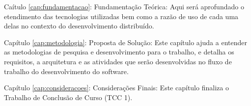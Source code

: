 Caítulo \ref{cap:fundamentacao}: Fundamentação Teórica: Aqui será aprofundado o etendimento das tecnologias utilizadas bem como a razão de uso de cada uma delas no contexto do desenvolvimento distribuído.

Capítulo \ref{cap:metodologia}: Proposta de Solução: Este capítulo ajuda a entender as metodologias de pesquisa e desenvolvimento para o trabalho, e detalha os requisitos, a arquitetura e as atividades que serão desenvolvidas no fluxo de trabalho do desenvolvimento do software.

Capítulo \ref{cap:consideracoes}: Considerações Finais: Este capítulo finaliza o Trabalho de Conclusão de Curso (TCC 1).